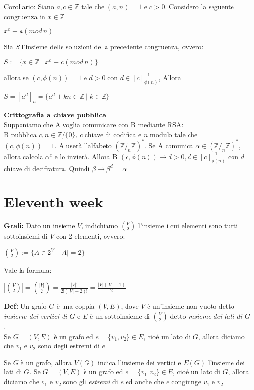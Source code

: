 \documentclass[11pt, letterpaper]{article}
\begin{document}
Corollario: Siano $a,c\in\mathbb{Z}$ tale che $(a,n)=1$ e $c>0$. Considero la seguente congruenza 
in $x\in\mathbb{Z}$
\begin{center}
    $x^{c}\equiv a (mod\ n)$
\end{center}
Sia $S$ l'insieme delle soluzioni della precedente congruenza, ovvero:
\begin{center}
    $S:=\{x\in\mathbb{Z}\mid x^{c}\equiv a(mod\ n)\}$
\end{center}
allora se $(c,\phi(n))=1$ e $d>0$ con $d\in[c]^{-1}_{\phi(n)}$, Allora
\begin{center}
    $S=[a^{d}]_{n}=\{a^{d}+kn\in\mathbb{Z}\mid k\in\mathbb{Z}\}$
\end{center}

\textbf{Crittografia a chiave pubblica}\\Supponiamo che A voglia comunicare con B mediante RSA:\\
B pubblica $c,n\in\mathbb{Z}/\{0\}$, $c$ chiave di codifica e $n$ modulo tale che $(c,\phi(n))=1$. A userà
l'alfabeto $(\mathbb{Z}/_{n}\mathbb{Z})^{*}$. Se A comunica $\alpha\in(\mathbb{Z}/_{n}\mathbb{Z})^{*}$, allora 
calcola $\alpha^{c}$ e lo invierà. Allora B $(c,\phi(n))\rightarrow d>0, d\in[c]^{-1}_{\phi(n)}$ con $d$ 
chiave di decifratura. Quindi $\beta\rightarrow\beta^{d}=\alpha$


\newpage
\section{Eleventh week}
\textbf{Grafi:} Dato un insieme $V$, indichiamo $\binom{V}{2}$ l'insieme i cui elementi sono tutti sottoinsiemi di 
$V$ con 2 elementi, ovvero:
\begin{center}
    $\binom{V}{2}:=\{A\in 2^{V}\mid |A|=2\}$
\end{center}
Vale la formula:
\begin{center}
    $|\binom{V}{2}|=\binom{|V|}{2}=\frac{|V|!}{2!(|V|-2)!}=\frac{|V|(|V|-1)}{2}$
\end{center}

\textbf{Def:} Un grafo $G$ è una coppia $(V,E)$, dove $V$ è un'insieme non vuoto detto \textit{insieme
dei vertici di $G$} e $E$ è un sottoinsieme di $\binom{V}{2}$ detto \textit{insieme dei lati di $G$}.\\
Se $G=(V,E)$ è un grafo ed $e=\{v_{1},v_{2}\}\in E$, cioé un lato di $G$, allora diciamo che $v_{1}$ e
$v_{2}$ sono degli estremi di $e$

Se $G$ è un grafo, allora $V(G)$ indica l'insieme dei vertici e $E(G)$ l'insieme dei lati di $G$. Se 
$G=(V,E)$ è un grafo ed $e=\{v_{1},v_{2}\}\in E$, cioé un lato di $G$, allora diciamo che $v_{1}$ e
$v_{2}$ sono gli \textit{estremi} di $e$ ed anche che $e$ congiunge $v_{1}$ e $v_{2}$
\end{document}
